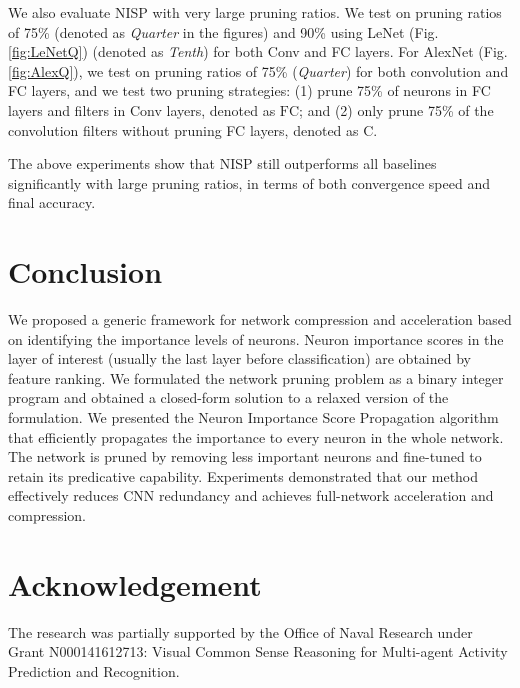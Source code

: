 \documentclass[10pt,twocolumn,letterpaper]{article}
\def\eg{\emph{e.g.}}
\begin{document}

We also evaluate NISP with very large pruning ratios. We test on pruning ratios of 75\% (denoted as \emph{Quarter} in the figures) and 90\% using LeNet (Fig. \ref{fig:LeNetQ}) (denoted as \emph{Tenth}) for both Conv and FC layers.
For AlexNet (Fig. \ref{fig:AlexQ}), we test on pruning ratios of 75\% (\emph{Quarter}) for both convolution and FC layers, and we test two pruning strategies: (1) prune 75\% of neurons in FC layers and filters in Conv layers, denoted as \emph{$\text{FC}$}; and (2) only prune 75\% of the convolution filters without pruning FC layers, denoted as \emph{$\text{C}$}.

The above experiments show that NISP still outperforms all baselines significantly with large pruning ratios, in terms of both convergence speed and final accuracy.



\section{Conclusion}
We proposed a generic framework for network compression and acceleration based on identifying the importance levels of neurons. Neuron importance scores in the layer of interest (usually the last layer before classification) are obtained by feature ranking. We formulated the network pruning problem as a binary integer program and obtained a closed-form solution to a relaxed version of the formulation. We presented the Neuron Importance Score Propagation algorithm that efficiently propagates the importance to every neuron in the whole network. The network is pruned by removing less important neurons and fine-tuned to retain its predicative capability. Experiments demonstrated that our method effectively reduces CNN redundancy and achieves full-network acceleration and compression.

\section*{Acknowledgement}
The research was partially supported by the Office of Naval Research under Grant N000141612713: Visual Common Sense Reasoning for Multi-agent Activity Prediction and Recognition.
\end{document}
